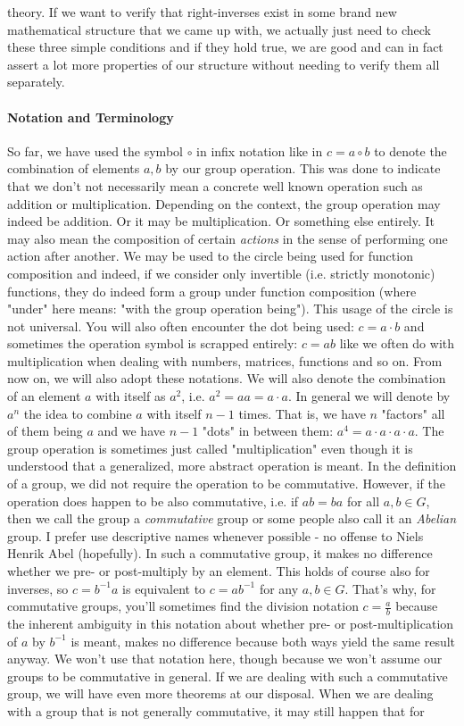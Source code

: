 theory. If we want to verify that right-inverses exist in some brand new mathematical structure that we came up with, we actually just need to check these three simple conditions and if they hold true, we are good and can in fact assert a lot more properties of our structure without needing to verify them all separately. 

\paragraph{Notation and Terminology}
So far, we have used the symbol $\circ$ in infix notation like in $c = a \circ b$ to denote the combination of elements $a,b$ by our group operation. This was done to indicate that we don't not necessarily mean a concrete well known operation such as addition or multiplication. Depending on the context, the group operation may indeed be addition. Or it may be multiplication. Or something else entirely. It may also mean the composition of certain \emph{actions} in the sense of performing one action after another. We may be used to the circle being used for function composition and indeed, if we consider only invertible (i.e. strictly monotonic) functions, they do indeed form a group under function composition (where "under" here means: "with the group operation being"). This usage of the circle is not universal. You will also often encounter the dot being used: $c = a \cdot b$ and sometimes the operation symbol is scrapped entirely: $c = a b$ like we often do with multiplication when dealing with numbers, matrices, functions and so on. From now on, we will also adopt these notations. We will also denote the combination of an element $a$ with itself as $a^2$, i.e. $a^2 = a a = a \cdot a$. In general we will denote by $a^n$ the idea to combine $a$ with itself $n-1$ times. That is, we have $n$ "factors" all of them being $a$ and we have $n-1$ "dots" in between them: $a^4 = a \cdot a \cdot a \cdot a$. The group operation is sometimes just called "multiplication" even though it is understood that a generalized, more abstract operation is meant. In the definition of a group, we did not require the operation to be commutative. However, if the operation does happen to be also commutative, i.e. if $a b = b a$ for all $a,b \in G$, then we call the group a \emph{commutative} group or some people also call it an \emph{Abelian} group. I prefer use descriptive names whenever possible - no offense to Niels Henrik Abel (hopefully). In such a commutative group, it makes no difference whether we pre- or post-multiply by an element. This holds of course also for inverses, so $c = b^{-1} a$ is equivalent to $c = a b^{-1}$ for any $a,b \in G$. That's why, for commutative groups, you'll sometimes find the division notation $c = \frac{a}{b}$ because the inherent ambiguity in this notation about whether pre- or post-multiplication of $a$ by $b^{-1}$ is meant, makes no difference because both ways yield the same result anyway. We won't use that notation here, though because we won't assume our groups to be commutative in general. If we are dealing with such a commutative group, we will have even more theorems at our disposal. When we are dealing with a group that is not generally commutative, it may still happen that for 